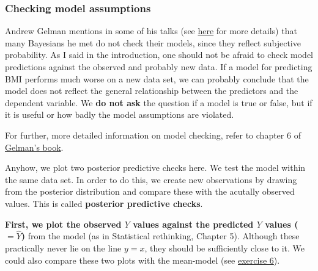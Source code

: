 \documentclass[
]{book}
\begin{document}
\subsubsection{Checking model assumptions}\label{check_model_bayes}

Andrew Gelman mentions in some of his talks (see \href{https://sites.stat.columbia.edu/gelman/research/published/philosophy_chapter.pdf}{here} for more details)
that many Bayesians he met do not check their models, since they reflect subjective probability.
As I said in the introduction, one should not be afraid to check model predictions against the observed
and probably new data. If a model for predicting BMI performs much worse on a new data set,
we can probably conclude that the model does not reflect the general relationship between the predictors
and the dependent variable. We \textbf{do not ask} the question if a model is true or false, but if it is useful or
how badly the model assumptions are violated.

For further, more detailed information on model checking, refer to chapter 6 of
\href{https://sites.stat.columbia.edu/gelman/book/BDA3.pdf}{Gelman's book}.

Anyhow, we plot two posterior predictive checks here.
We test the model within the same data set.
In order to do this, we create new observations
by drawing from the posterior distribution and compare these with the acutally
observed values. This is called \textbf{posterior predictive checks}.

\textbf{First, we plot the observed \(Y\) values against the predicted \(Y\) values (\(=\hat{Y}\))}
from the model (as in Statistical rethinking, Chapter 5).
Although these practically never lie on the line \(y=x\), they should be sufficiently
close to it. We could also compare these two plots with the mean-model (see \hyperref[exercise6_multiple_regression]{exercise 6}).
\end{document}

